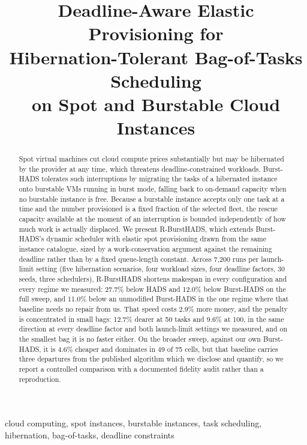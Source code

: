 \documentclass[conference]{IEEEtran}
\begin{document}
\title{Deadline-Aware Elastic Provisioning for\\Hibernation-Tolerant Bag-of-Tasks Scheduling\\on Spot and Burstable Cloud Instances}

\author{\IEEEauthorblockN{}\IEEEauthorblockA{}}

\maketitle

\begin{abstract}
Spot virtual machines cut cloud compute prices substantially but may be
hibernated by the provider at any time, which threatens deadline-constrained
workloads. Burst-HADS tolerates such interruptions by migrating the tasks of a
hibernated instance onto burstable VMs running in burst mode, falling back to
on-demand capacity when no burstable instance is free. Because a burstable
instance accepts only one task at a time and the number provisioned is a fixed
fraction of the selected fleet, the rescue capacity available at the moment of
an interruption is bounded independently of how much work is actually
displaced. We present R-BurstHADS, which extends Burst-HADS's dynamic scheduler
with elastic spot provisioning drawn from the same instance catalogue, sized by
a work-conservation argument against the remaining deadline rather than by a
fixed queue-length constant. Across 7{,}200 runs per launch-limit setting (five
hibernation scenarios, four workload sizes, four deadline factors, 30 seeds,
three schedulers), R-BurstHADS shortens makespan in every configuration and
every regime we measured: 27.7\% below HADS and 12.0\% below Burst-HADS on the
full sweep, and 11.0\% below an unmodified Burst-HADS in the one regime where
that baseline needs no repair from us. That speed costs 2.9\% more money, and
the penalty is concentrated in small bags: 12.7\% dearer at 50 tasks and 9.6\%
at 100, in the same direction at every deadline factor and both launch-limit
settings we measured, and on the smallest bag it is no faster either. On the broader sweep, against our
own Burst-HADS, it is 4.6\% cheaper and dominates in 49 of 75 cells, but that
baseline carries three departures from the published algorithm which we
disclose and quantify, so we report a controlled comparison with a documented
fidelity audit rather than a reproduction.
\end{abstract}

\begin{IEEEkeywords}
cloud computing, spot instances, burstable instances, task scheduling,
hibernation, bag-of-tasks, deadline constraints
\end{IEEEkeywords}
\end{document}
